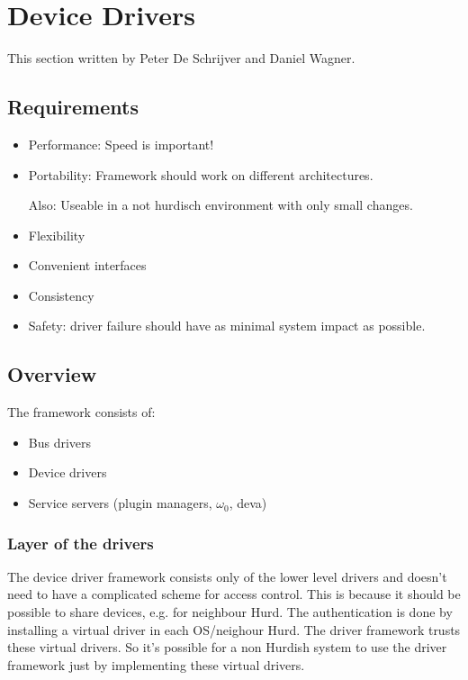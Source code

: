 \chapter{Device Drivers}

This section written by Peter De Schrijver and Daniel Wagner.


\section{Requirements}

\begin{itemize}
\item Performance: Speed is important!
\item Portability: Framework should work on different architectures.
    
  Also: Useable in a not hurdisch environment with only
  small changes.

\item Flexibility
\item Convenient interfaces
\item Consistency 
\item Safety: driver failure should have as minimal system impact as
  possible.
\end{itemize}


\section{Overview}

The framework consists of: 
\begin{itemize}
\item Bus drivers
\item Device drivers
\item Service servers (plugin managers, $\omega_0$, deva)
\end{itemize}

\subsection{Layer of the drivers}

The device driver framework consists only of the lower level drivers
and doesn't need to have a complicated scheme for access control.
This is because it should be possible to share devices, e.g. for
neighbour Hurd.  The authentication is done by installing a virtual
driver in each OS/neighour Hurd.  The driver framework trusts these
virtual drivers.  So it's possible for a non Hurdish system to use
the driver framework just by implementing these virtual drivers.
  
